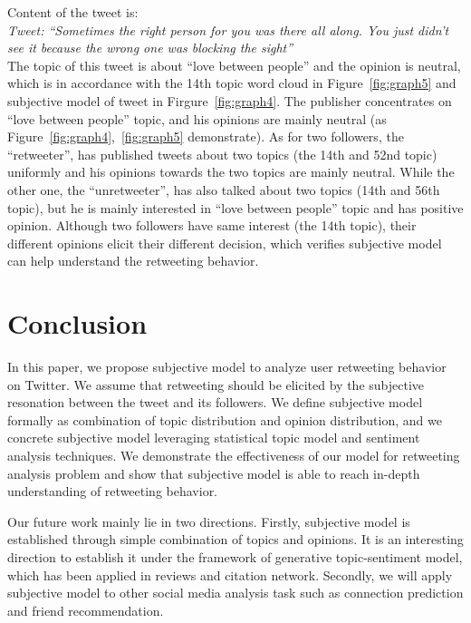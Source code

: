 \documentclass{acm_proc_article-sp}
\begin{document}
Content of the tweet is:\\
\textit{Tweet: ``Sometimes the right person for you was there all along. You just didn’t see it because the wrong one was blocking the sight''} \\
The topic of this tweet is about ``love between people'' and the opinion is neutral, which is in accordance with the 14th topic word cloud in Figure~\ref{fig:graph5} and subjective model of tweet in Firgure~\ref{fig:graph4}.
The publisher concentrates on ``love between people'' topic, and his opinions are mainly neutral (as Figure~\ref{fig:graph4},~\ref{fig:graph5} demonstrate).
As for two followers, the ``retweeter'', has published tweets about two topics (the 14th and 52nd topic) uniformly and his opinions towards the two topics are mainly neutral.
While the other one, the ``unretweeter'', has also talked about two topics (14th and 56th topic), but he is mainly interested in ``love between people'' topic and has positive opinion.
Although two followers have same interest (the 14th topic), their different opinions elicit their different decision, which verifies subjective model can help understand the retweeting behavior.

\section{Conclusion}
In this paper, we propose subjective model to analyze user retweeting behavior on Twitter. We assume that retweeting should be elicited by the subjective resonation between the tweet and its followers. 
We define subjective model formally as combination of topic distribution and opinion distribution, and we concrete subjective model leveraging statistical topic model and sentiment analysis techniques.
We demonstrate the effectiveness of our model for retweeting analysis problem and show that subjective model is able to reach in-depth understanding of retweeting behavior. 

Our future work mainly lie in two directions.
Firstly, subjective model is established through simple combination of topics and opinions. It is an interesting direction to establish it under the framework of generative topic-sentiment model, which has been applied in reviews and citation network.
Secondly, we will apply subjective model to other social media analysis task such as connection prediction and friend recommendation.


\end{document}
